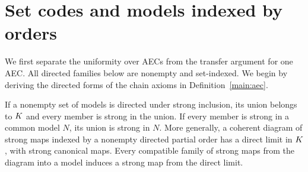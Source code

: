 \section{Set codes and models indexed by orders}
\label{found:section-reduction-orders}

We first separate the uniformity over AECs from the transfer argument for
one AEC. All directed families below are nonempty and set-indexed. We
begin by deriving the directed forms of the chain axioms in
Definition~\ref{main:aec}.

\begin{lemma}
\label{found:directed-colimits}
If a nonempty set of models is directed under strong inclusion, its
union belongs to $K$ and every member is strong in the union. If
every member is strong in a common model $N$, its union is strong in
$N$. More generally, a coherent diagram of strong maps indexed by a
nonempty directed partial order has a direct limit in $K$, with
strong canonical maps. Every compatible family of strong maps from
the diagram into a model induces a strong map from the direct limit.
\end{lemma}


